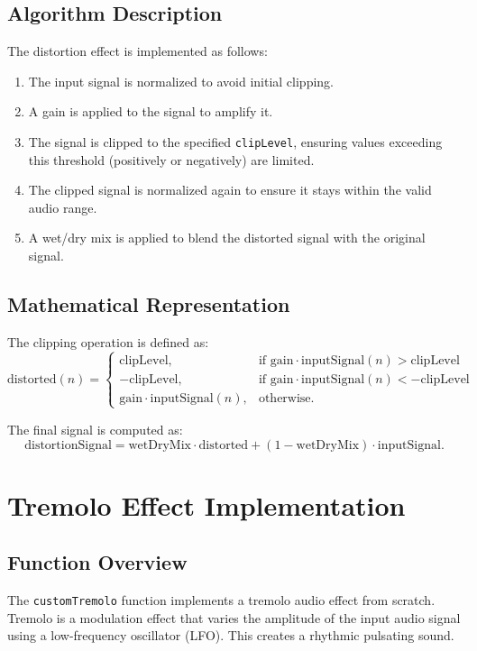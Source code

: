 \documentclass{article}
\begin{document}
\subsection{Algorithm Description}
The distortion effect is implemented as follows:
\begin{enumerate}
    \item The input signal is normalized to avoid initial clipping.
    \item A gain is applied to the signal to amplify it.
    \item The signal is clipped to the specified \texttt{clipLevel}, ensuring values exceeding this threshold (positively or negatively) are limited.
    \item The clipped signal is normalized again to ensure it stays within the valid audio range.
    \item A wet/dry mix is applied to blend the distorted signal with the original signal.
\end{enumerate}

\subsection{Mathematical Representation}
The clipping operation is defined as:
\[
\text{distorted}(n) =
\begin{cases}
\text{clipLevel}, & \text{if } \text{gain} \cdot \text{inputSignal}(n) > \text{clipLevel} \\
-\text{clipLevel}, & \text{if } \text{gain} \cdot \text{inputSignal}(n) < -\text{clipLevel} \\
\text{gain} \cdot \text{inputSignal}(n), & \text{otherwise}.
\end{cases}
\]

The final signal is computed as:
\[
\text{distortionSignal} = \text{wetDryMix} \cdot \text{distorted} + (1 - \text{wetDryMix}) \cdot \text{inputSignal}.
\]

\section{Tremolo Effect Implementation}

\subsection{Function Overview}
The \texttt{customTremolo} function implements a tremolo audio effect from scratch. Tremolo is a modulation effect that varies the amplitude of the input audio signal using a low-frequency oscillator (LFO). This creates a rhythmic pulsating sound.
\end{document}
